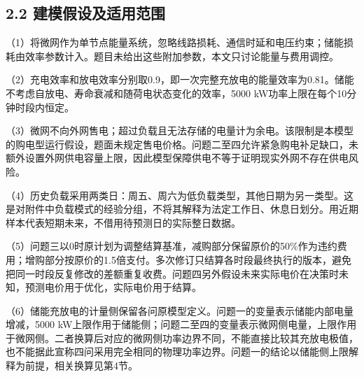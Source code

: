\documentclass[UTF8,a4paper,zihao=-4,fontset=windows]{ctexart}
\begin{document}
\subsection{2.2 建模假设及适用范围}
（1）将微网作为单节点能量系统，忽略线路损耗、通信时延和电压约束；储能损耗由效率参数计入。题目未给出这些附加参数，本文只讨论能量与费用调控。
\par
（2）充电效率和放电效率分别取0.9，即一次完整充放电的能量效率为0.81。储能不考虑自放电、寿命衰减和随荷电状态变化的效率，5000 kW功率上限在每个10分钟时段内恒定。
\par
（3）微网不向外网售电；超过负载且无法存储的电量计为余电。该限制是本模型的购电型运行假设，题面未规定售电价格。问题二至四允许紧急购电补足缺口，未额外设置外网供电容量上限，因此模型保障供电不等于证明现实外网不存在供电风险。
\par
（4）历史负载采用两类日：周五、周六为低负载类型，其他日期为另一类型。这是对附件中负载模式的经验分组，不将其解释为法定工作日、休息日划分。用近期样本代表短期未来，不借用待预测日的实际整日数据。
\par
（5）问题三以0时原计划为调整结算基准，减购部分保留原价的50\%作为违约费用；增购部分按原价的1.5倍支付。多次修订只结算各时段最终执行的版本，避免把同一时段反复修改的差额重复收费。问题四另外假设未来实际电价在决策时未知，预测电价用于优化，实际电价用于结算。
\par
（6）储能充放电的计量侧保留各问原模型定义。问题一的变量表示储能内部电量增减，5000 kW上限作用于储能侧；问题二至四的变量表示微网侧电量，上限作用于微网侧。二者换算后对应的微网侧功率边界不同，不能直接比较其充放电极值，也不能据此宣称四问采用完全相同的物理功率边界。问题一的结论以储能侧上限解释为前提，相关换算见第4节。
\par
\end{document}
